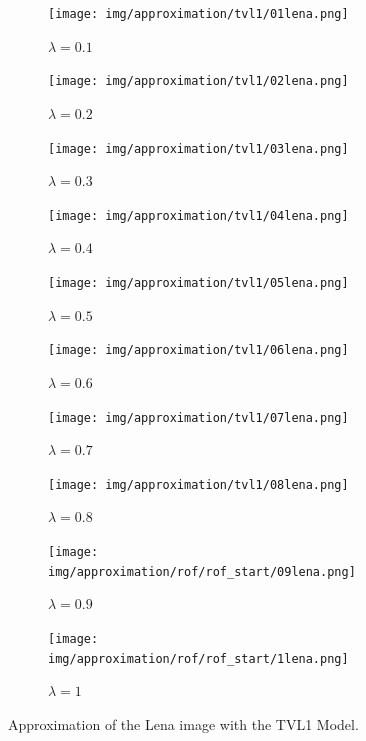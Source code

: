 \documentclass{scrreprt}
\begin{document}
                \begin{figure}[!ht]
                \centering
                \begin{subfigure}[b]{0.18\textwidth}
                    \texttt{[image: img/approximation/tvl1/01lena.png]}
                    \caption{$\lambda = 0.1$}
                \end{subfigure}
                \begin{subfigure}[b]{0.18\textwidth}
                    \texttt{[image: img/approximation/tvl1/02lena.png]}
                    \caption{$\lambda = 0.2$}
                \end{subfigure}
                \begin{subfigure}[b]{0.18\textwidth}
                    \texttt{[image: img/approximation/tvl1/03lena.png]}
                    \caption{$\lambda = 0.3$}
                \end{subfigure}
                \begin{subfigure}[b]{0.18\textwidth}
                    \texttt{[image: img/approximation/tvl1/04lena.png]}
                    \caption{$\lambda = 0.4$}
                \end{subfigure}
                \begin{subfigure}[b]{0.18\textwidth}
                    \texttt{[image: img/approximation/tvl1/05lena.png]}
                    \caption{$\lambda = 0.5$}
                \end{subfigure}
                \begin{subfigure}[b]{0.18\textwidth}
                    \texttt{[image: img/approximation/tvl1/06lena.png]}
                    \caption{$\lambda = 0.6$}
                \end{subfigure}
                \begin{subfigure}[b]{0.18\textwidth}
                    \texttt{[image: img/approximation/tvl1/07lena.png]}
                    \caption{$\lambda = 0.7$}
                \end{subfigure}
                \begin{subfigure}[b]{0.18\textwidth}
                    \texttt{[image: img/approximation/tvl1/08lena.png]}
                    \caption{$\lambda = 0.8$}
                \end{subfigure}
                \begin{subfigure}[b]{0.18\textwidth}
                    \texttt{[image: img/approximation/rof/rof\_start/09lena.png]}
                    \caption{$\lambda = 0.9$}
                \end{subfigure}
                \begin{subfigure}[b]{0.18\textwidth}
                    \texttt{[image: img/approximation/rof/rof\_start/1lena.png]}
                    \caption{$\lambda = 1$}
                \end{subfigure}
                \caption[Best estimate of $\lambda$ for the TVL1 model.]{Approximation of the Lena image with the TVL1 Model.}
            \label{fig:tvl1_lena_first_compare}
            \end{figure}
\end{document}
